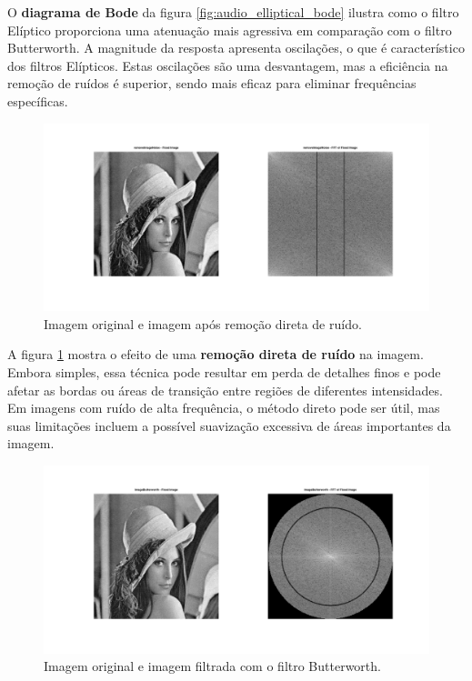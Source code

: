 O \textbf{diagrama de Bode} da figura \ref{fig:audio_elliptical_bode} ilustra como o filtro Elíptico proporciona uma atenuação mais agressiva em comparação com o filtro Butterworth. A magnitude da resposta apresenta oscilações, o que é característico dos filtros Elípticos. Estas oscilações são uma desvantagem, mas a eficiência na remoção de ruídos é superior, sendo mais eficaz para eliminar frequências específicas.

\begin{figure}[H]
    \centering
    \includegraphics[width=1\linewidth]{03_results/assets/image_direct_remove_noise.png}
    \caption{Imagem original e imagem após remoção direta de ruído.}
    \label{fig:image_direct_remove_noise}
\end{figure}

A figura \ref{fig:image_direct_remove_noise} mostra o efeito de uma \textbf{remoção direta de ruído} na imagem. Embora simples, essa técnica pode resultar em perda de detalhes finos e pode afetar as bordas ou áreas de transição entre regiões de diferentes intensidades. Em imagens com ruído de alta frequência, o método direto pode ser útil, mas suas limitações incluem a possível suavização excessiva de áreas importantes da imagem.

\begin{figure}[H]
    \centering
    \includegraphics[width=1\linewidth]{03_results/assets/image_butterworth.png}
    \caption{Imagem original e imagem filtrada com o filtro Butterworth.}
    \label{fig:image_butterworth}
\end{figure}

